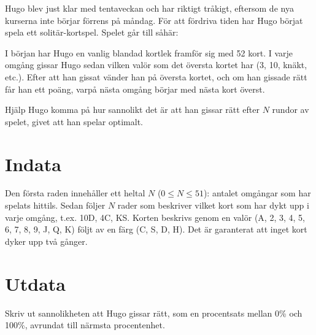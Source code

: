 Hugo blev just klar med tentaveckan och har riktigt tråkigt, eftersom de nya kurserna inte börjar förrens på måndag.
För att fördriva tiden har Hugo börjat spela ett solitär-kortspel. Spelet går till såhär:

I början har Hugo en vanlig blandad kortlek framför sig med 52 kort. I varje omgång gissar Hugo sedan vilken valör som det översta kortet har (3, 10, knäkt, etc.).
Efter att han gissat vänder han på översta kortet, och om han gissade rätt får han ett poäng, varpå nästa omgång börjar med nästa kort överst.

Hjälp Hugo komma på hur sannolikt det är att han gissar rätt efter $N$ rundor av spelet, givet att han spelar optimalt.

\section*{Indata}
Den första raden innehåller ett heltal $N$ ($0 \le N \le 51$): antalet omgångar som har spelats hittils.
Sedan följer $N$ rader som beskriver vilket kort som har dykt upp i varje omgång, t.ex. 10D, 4C, KS.
Korten beskrivs genom en valör (A, 2, 3, 4, 5, 6, 7, 8, 9, J, Q, K) följt av en färg (C, S, D, H).
Det är garanterat att inget kort dyker upp två gånger.

\section*{Utdata}
Skriv ut sannolikheten att Hugo gissar rätt, som en procentsats mellan 0\% och 100\%, avrundat till närmsta procentenhet.
